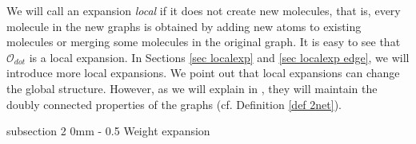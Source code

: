 \documentclass{article}
\makeatletter
\newcommand{\1}{\mathds{1}}
\numberwithin{equation}{section}
\renewcommand{\cal}{\mathcal}
\DeclareMathOperator{\OO}{O}
\theoremstyle{plain} %
\theoremstyle{remark}
\newcommand{\cor}{\color{red}}
\newcommand{\nc}{\normalcolor}
\renewcommand{\section}{\@startsection
{section}%
{1}%
{0mm}%
{-2\baselineskip}%
{2\baselineskip}%
{\normalfont\large\scshape\centering}} %
\renewcommand{\subsection}{\@startsection
{subsection}%
{2}%
{0mm}%
{-\baselineskip}%
{0.5\baselineskip}%
{\normalfont\bf\itshape}} %
\newcommand{\hty}[1]{{\cor (ht: #1) }}
\makeatother
\begin{document}
We will call an expansion \emph{local} if it does not create new molecules, that is, every molecule in the new graphs is obtained by adding new atoms to existing molecules or merging some molecules in the original graph. It is easy to see that $\cal O_{dot}$ is a local expansion. In Sections \ref{sec localexp} and \ref{sec localexp edge}, we will introduce more local expansions. %
We point out that local expansions  can change the global structure. However, as we will explain in \cite{PartII_high}, they will maintain the doubly connected properties of the graphs (cf. Definition \ref{def 2net}). 






 
\subsection{Weight expansion} \label{sec localexp}
\end{document}
